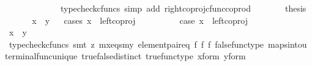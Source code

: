 \begin{isabellebody}
\ \isamarkupfalse%
\ {\isachardoublequoteopen}{\isachardot}{\kern0pt}{\isachardot}{\kern0pt}{\isachardot}{\kern0pt}\ {\isacharequal}{\kern0pt}\ {\isasymlangle}{\isasymf}{\isacharcomma}{\kern0pt}{\isasymt}{\isasymrangle}{\isachardoublequoteclose}\isanewline
\ \ \ \ \ \ \isamarkupfalse%
\ {\isacharparenleft}{\kern0pt}typecheck{\isacharunderscore}{\kern0pt}cfuncs{\isacharcomma}{\kern0pt}\ simp\ add{\isacharcolon}{\kern0pt}\ right{\isacharunderscore}{\kern0pt}coproj{\isacharunderscore}{\kern0pt}cfunc{\isacharunderscore}{\kern0pt}coprod{\isacharparenright}{\kern0pt}\isanewline
\ \ \ \ \isamarkupfalse%
\ \isamarkupfalse%
\ {\isacharquery}{\kern0pt}thesis\isacommand{{\isachardot}{\kern0pt}}\isamarkupfalse%
\isanewline
\ \ \isamarkupfalse%
\isanewline
\ \ \isamarkupfalse%
\ {\isachardoublequoteopen}x\ {\isacharequal}{\kern0pt}\ y{\isachardoublequoteclose}\isanewline
\ \ \isamarkupfalse%
{\isacharparenleft}{\kern0pt}cases\ {\isachardoublequoteopen}x\ {\isacharequal}{\kern0pt}\ left{\isacharunderscore}{\kern0pt}coproj\ {\isasymone}\ {\isacharparenleft}{\kern0pt}{\isasymone}\ {\isasymCoprod}\ {\isasymone}{\isacharparenright}{\kern0pt}{\isachardoublequoteclose}{\isacharparenright}{\kern0pt}\isanewline
\ \ \ \ \isamarkupfalse%
\ case{}{\isacharcolon}{\kern0pt}\ {\isachardoublequoteopen}x\ {\isacharequal}{\kern0pt}\ left{\isacharunderscore}{\kern0pt}coproj\ {\isasymone}\ {\isacharparenleft}{\kern0pt}{\isasymone}\ {\isasymCoprod}\ {\isasymone}{\isacharparenright}{\kern0pt}{\isachardoublequoteclose}\isanewline
\ \ \ \ \isamarkupfalse%
\ \isamarkupfalse%
\ {\isachardoublequoteopen}x\ {\isacharequal}{\kern0pt}\ y{\isachardoublequoteclose}\isanewline
\ \ \ \ \ \ \isamarkupfalse%
\ {\isacharparenleft}{\kern0pt}typecheck{\isacharunderscore}{\kern0pt}cfuncs{\isacharcomma}{\kern0pt}\ smt\ {\isacharparenleft}{\kern0pt}z{}{\isacharparenright}{\kern0pt}\ mx{\isacharunderscore}{\kern0pt}eqs{\isacharunderscore}{\kern0pt}my\ element{\isacharunderscore}{\kern0pt}pair{\isacharunderscore}{\kern0pt}eq\ f{}\ f{}\ f{}\ false{\isacharunderscore}{\kern0pt}func{\isacharunderscore}{\kern0pt}type\ maps{\isacharunderscore}{\kern0pt}into{\isacharunderscore}{\kern0pt}{}u{}\ terminal{\isacharunderscore}{\kern0pt}func{\isacharunderscore}{\kern0pt}unique\ true{\isacharunderscore}{\kern0pt}false{\isacharunderscore}{\kern0pt}distinct\ true{\isacharunderscore}{\kern0pt}func{\isacharunderscore}{\kern0pt}type\ x{\isacharunderscore}{\kern0pt}form\ y{\isacharunderscore}{\kern0pt}form{\isacharparenright}{\kern0pt}\isanewline

\end{isabellebody}

